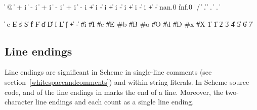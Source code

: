 \begin{grammar}%
 \:  
 \: %
      \|  @ 
   \> \|  +  i %
      \|  -  i
   \> \|  +  i %
      \|  -  i
   \> \|  + i %
      \|  - i
   \> \| +  i %
      \| -  i 
   \> \| +  i %
      \| -  i
   \> \| + i %
      \| - i
 \:  
  \> \| +  \| - 
 \: nan.0 \| inf.0
 \: %
   \> \|  / 
   \> \|  
 \: %
          
   \> \| .  \arbno{\#} 
   \> \|  .  \arbno{\#} 
   \> \|  \atleastone{\#} . \arbno{\#} 
 \:  \arbno{\#}
 \: %
          
   \> \|  
\end{grammar}

\begin{grammar}%
 \:  
   \> \|   
 \: e \| E \| s \| S \| f \| F
   \> \| d \| D \| l \| L
 \: 
   \> \| | 
 \:   \| + \|  -
 \: 
   \> \| \#i \| \#I \| \#e \| \#E
 \: \#b \| \#B
 \: \#o \| \#O
 \:  \| \#d \| \#D
 \: \#x \| \#X
  \| 1
  \| 1 \| 2 \| 3 \| 4 \| 5 \| 6 \| 7
 \: 
 \: 
\end{grammar}

\subsection{Line endings}
\label{lineendings}

Line endings are significant in Scheme in single-line comments (see
section~\ref{whitespaceandcomments}) and within string literals.  In
Scheme source code, and of the line endings in 
marks the end of a line.  Moreover, the two-character line endings
  and 
 each count as a single line ending.

